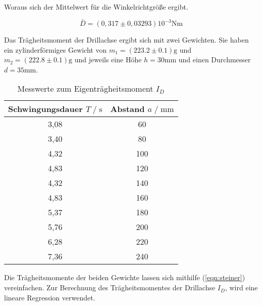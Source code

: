 Woraus sich der Mittelwert für die Winkelrichtgröße ergibt.

\begin{equation}
  \bar D = (0,317\pm 0,03293) 10^{-3}\si{\newton\meter}
\end{equation}

Das Trägheitsmoment der Drillachse ergibt sich mit zwei Gewichten.
Sie haben ein zylinderförmiges Gewicht von $m_1 = (223.2 \pm 0.1) \text{g}$ und $m_2 = (222.8 \pm 0.1) \text{g}$ und jeweils eine
Höhe $h=30\si{\milli\meter}$ und einen Durchmesser $d=35\si{\milli\meter}$.

\begin{table}
  \centering
   \caption{Messwerte zum Eigenträgheitsmoment $I_D$}
   \label{tab:eigentraegheitmess}
   \begin{tabular}{c c}
       \toprule
       Schwingungsdauer $ T \;/\; \si{\second}$ & Abstand $a \;/\; \si{\milli\meter}$ \\
       \midrule
       3,08 & 60 \\
       3,40 & 80 \\
       4,32 & 100 \\
       4,83 & 120 \\
       4,32 & 140 \\
       4,83 & 160 \\
       5,37 & 180 \\
       5,76 & 200 \\
       6,28 & 220 \\
       7,36 & 240 \\
       \bottomrule
   \end{tabular}
\end{table}





Die Trägheitsmomente der beiden Gewichte lassen sich mithilfe (\autoref{eqn:steiner}) vereinfachen. Zur Berechnung
des Trägheitsmomentes der Drillachse $I_D$, wird eine lineare Regression verwendet.

